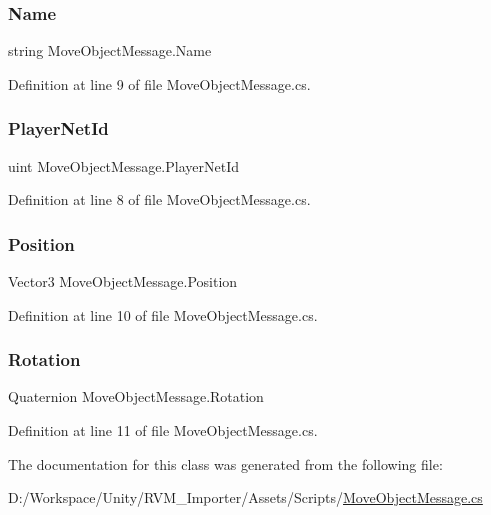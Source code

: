 \subsubsection{\texorpdfstring{Name}{Name}}
{\footnotesize\ttfamily string Move\+Object\+Message.\+Name}



Definition at line 9 of file Move\+Object\+Message.\+cs.

\mbox{\label{class_move_object_message_a431d0baf4f5d0b45ae8d4edda85edf97}} 
\subsubsection{\texorpdfstring{PlayerNetId}{PlayerNetId}}
{\footnotesize\ttfamily uint Move\+Object\+Message.\+Player\+Net\+Id}



Definition at line 8 of file Move\+Object\+Message.\+cs.

\mbox{\label{class_move_object_message_a64834890d0b6424af90c5c39d0ca4413}} 
\subsubsection{\texorpdfstring{Position}{Position}}
{\footnotesize\ttfamily Vector3 Move\+Object\+Message.\+Position}



Definition at line 10 of file Move\+Object\+Message.\+cs.

\mbox{\label{class_move_object_message_aa28c8b56da7e61efcd2cb3c6d14ee2c1}} 
\subsubsection{\texorpdfstring{Rotation}{Rotation}}
{\footnotesize\ttfamily Quaternion Move\+Object\+Message.\+Rotation}



Definition at line 11 of file Move\+Object\+Message.\+cs.



The documentation for this class was generated from the following file\+:\begin{DoxyCompactItemize}
\item 
D\+:/\+Workspace/\+Unity/\+R\+V\+M\+\_\+\+Importer/\+Assets/\+Scripts/\mbox{\hyperlink{_move_object_message_8cs}{Move\+Object\+Message.\+cs}}\end{DoxyCompactItemize}
